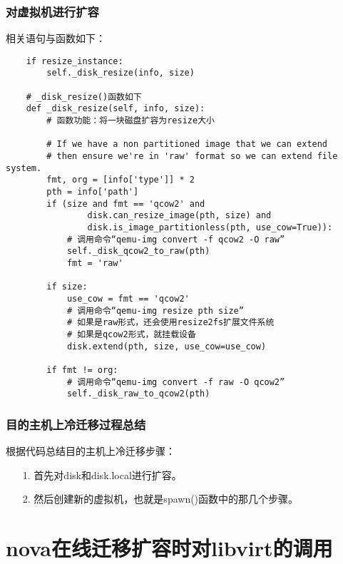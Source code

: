 \documentclass[a4paper,left=1.5cm,right=1.5cm,11pt]{article}
\begin{document}
\subsubsection{对虚拟机进行扩容}
	相关语句与函数如下：
	\begin{lstlisting}
	if resize_instance:
		self._disk_resize(info, size)

	# _disk_resize()函数如下
	def _disk_resize(self, info, size):
        # 函数功能：将一块磁盘扩容为resize大小

		# If we have a non partitioned image that we can extend
        # then ensure we're in 'raw' format so we can extend file system.
        fmt, org = [info['type']] * 2
        pth = info['path']
        if (size and fmt == 'qcow2' and
                disk.can_resize_image(pth, size) and
                disk.is_image_partitionless(pth, use_cow=True)):
			# 调用命令“qemu-img convert -f qcow2 -O raw”
            self._disk_qcow2_to_raw(pth)
            fmt = 'raw'

        if size:
            use_cow = fmt == 'qcow2'
			# 调用命令“qemu-img resize pth size”
			# 如果是raw形式，还会使用resize2fs扩展文件系统
			# 如果是qcow2形式，就挂载设备
            disk.extend(pth, size, use_cow=use_cow)

        if fmt != org:
            # 调用命令“qemu-img convert -f raw -O qcow2”
            self._disk_raw_to_qcow2(pth)
	\end{lstlisting}

\subsubsection{目的主机上冷迁移过程总结}
	根据代码总结目的主机上冷迁移步骤：
	\begin{itemize}
		\item[1.] 首先对disk和disk.local进行扩容。
		\item[2.] 然后创建新的虚拟机，也就是spawn()函数中的那几个步骤。
	\end{itemize}

\clearpage

\section{nova在线迁移扩容时对libvirt的调用}
\end{document}
